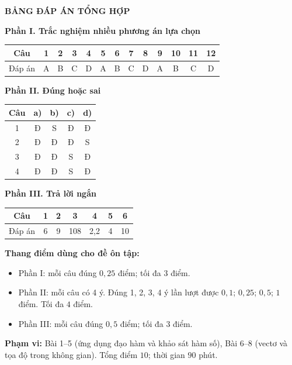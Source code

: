\documentclass[12pt,a4paper]{article}
\begin{document}
\newpage\pagestyle{answers}
\begin{center}\Large\textbf{BẢNG ĐÁP ÁN TỔNG HỢP}\end{center}
\textbf{Phần I. Trắc nghiệm nhiều phương án lựa chọn}
\begin{center}
\renewcommand{\arraystretch}{1.5}
\begin{tabular}{|c|*{12}{c|}}\hline
Câu & 1&2&3&4&5&6&7&8&9&10&11&12\\\hline
Đáp án & A & B & C & D & A & B & C & D & A & B & C & D \\\hline
\end{tabular}
\end{center}

\textbf{Phần II. Đúng hoặc sai}
\begin{center}
\renewcommand{\arraystretch}{1.4}
\begin{tabular}{|c|c|c|c|c|}\hline
Câu & a) & b) & c) & d)\\\hline
1 & Đ & S & Đ & Đ\\\hline
2 & Đ & Đ & Đ & S\\\hline
3 & Đ & Đ & S & Đ\\\hline
4 & Đ & Đ & S & Đ\\\hline
\end{tabular}
\end{center}

\textbf{Phần III. Trả lời ngắn}
\begin{center}
\renewcommand{\arraystretch}{1.5}
\begin{tabular}{|c|c|c|c|c|c|c|}\hline
Câu & 1 & 2 & 3 & 4 & 5 & 6\\\hline
Đáp án & 6 & 9 & 108 & 2,2 & 4 & 10 \\\hline
\end{tabular}
\end{center}

\textbf{Thang điểm dùng cho đề ôn tập:}
\begin{itemize}[leftmargin=*,itemsep=3pt]
\item Phần I: mỗi câu đúng $0{,}25$ điểm; tối đa $3$ điểm.
\item Phần II: mỗi câu có 4 ý. Đúng 1, 2, 3, 4 ý lần lượt được $0{,}1$; $0{,}25$; $0{,}5$; $1$ điểm. Tối đa $4$ điểm.
\item Phần III: mỗi câu đúng $0{,}5$ điểm; tối đa $3$ điểm.
\end{itemize}
\textbf{Phạm vi:} Bài 1–5 (ứng dụng đạo hàm và khảo sát hàm số), Bài 6–8 (vectơ và tọa độ trong không gian).
Tổng điểm $10$; thời gian $90$ phút.
\end{document}
